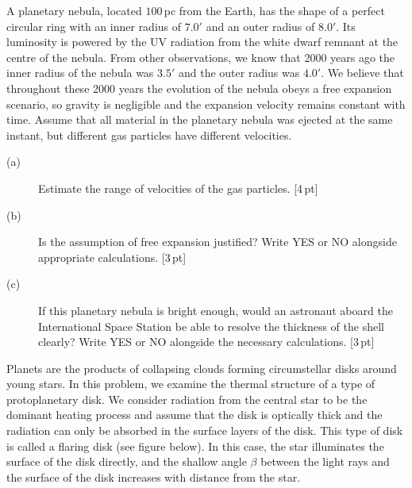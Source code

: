 A planetary nebula, located $100$\,pc from the Earth, has the shape of a perfect
circular ring with an inner radius of $7.0'$ and an outer radius of $8.0'$. Its
luminosity is powered by the UV radiation from the white dwarf remnant at the
centre of the nebula. From other observations, we know that 2000 years ago the
inner radius of the nebula was $3.5'$ and the outer radius was $4.0'$. We believe
that throughout these 2000 years the evolution of the nebula obeys a free
expansion scenario, so gravity is negligible and the expansion velocity remains
constant with time. Assume that all material in the planetary nebula was ejected
at the same instant, but different gas particles have different velocities.

\begin{description}
\item[(a)] Estimate the range of velocities of the gas particles. \hfill[4\,pt]
\item[(b)] Is the assumption of free expansion justified? Write YES or NO
  alongside appropriate calculations. \hfill[3\,pt]
\item[(c)] If this planetary nebula is bright enough, would an astronaut aboard
  the International Space Station be able to resolve the thickness of the shell
  clearly? Write YES or NO alongside the necessary calculations. \hfill[3\,pt]
\end{description}

Planets are the products of collapsing clouds forming circumstellar disks around
young stars. In this problem, we examine the thermal structure of a type of
protoplanetary disk. We consider radiation from the central star to be the
dominant heating process and assume that the disk is optically thick and the
radiation can only be absorbed in the surface layers of the disk. This type of
disk is called a flaring disk (see figure below). In this case, the star
illuminates the surface of the disk directly, and the shallow angle $\beta$
between the light rays and the surface of the disk increases with distance from
the star.

